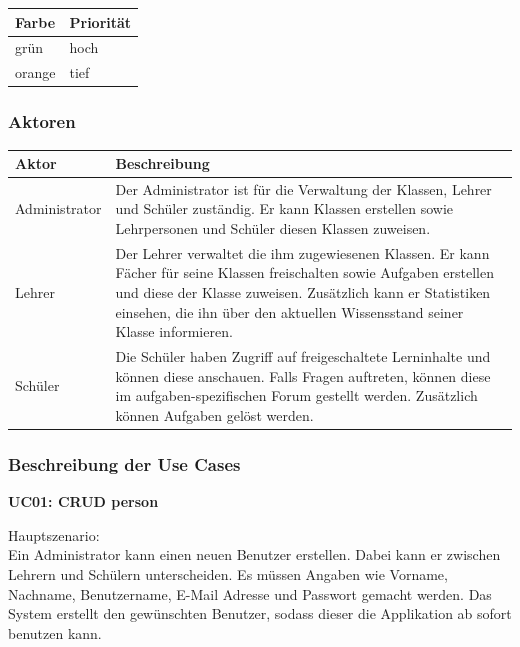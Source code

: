 \begin{tabular}{| p{1cm} | p{1.3cm}|}
	\hline
	\textbf{Farbe} & \textbf{Priorität} \\
	\hline	
	grün & hoch \\
	\hline
	orange & tief \\
	\hline
\end{tabular}


\subsubsection{Aktoren}

\begin{table}[H]
	\centering
	\begin{tabu} to 0.9\textwidth {l X}
	\toprule
	Aktor & Beschreibung \\ 
	\midrule
	Administrator & Der Administrator ist für die Verwaltung der Klassen, Lehrer und Schüler zuständig. Er kann Klassen erstellen sowie Lehrpersonen und Schüler diesen Klassen zuweisen. \\
	\midrule
		Lehrer & Der Lehrer verwaltet die ihm zugewiesenen Klassen. Er kann Fächer für seine Klassen freischalten sowie Aufgaben erstellen und diese der Klasse zuweisen. Zusätzlich kann er Statistiken einsehen, die ihn über den aktuellen Wissensstand seiner Klasse informieren. \\
	\midrule
		Schüler & Die Schüler haben Zugriff auf freigeschaltete Lerninhalte und können diese anschauen. Falls Fragen auftreten, können diese im aufgaben-spezifischen Forum gestellt werden. Zusätzlich können Aufgaben gelöst werden. \\
	\bottomrule
	\end{tabu}
\end{table}


\subsubsection{Beschreibung der Use Cases}
\textbf{UC01: CRUD person}

\noindent Hauptszenario: \\
Ein Administrator kann einen neuen Benutzer erstellen. Dabei kann er zwischen Lehrern und Schülern unterscheiden. Es müssen Angaben wie Vorname, Nachname, Benutzername, E-Mail Adresse und Passwort gemacht werden. Das System erstellt den gewünschten Benutzer, sodass dieser die Applikation ab sofort benutzen kann. \\

